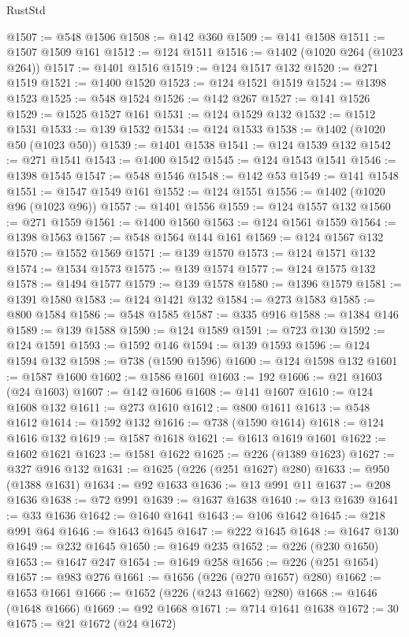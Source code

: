 \begin{lexlean}{RustStd}
\begin{coremodule}
{\begin{coremodule}
{{{{{{{{{{{{{{{{{{{{{{{{{{{{{{{{{{{{{@1507 := @548 @1506
@1508 := @142 @360
@1509 := @141 @1508
@1511 := @1507 @1509 @161
@1512 := @124 @1511
@1516 := @1402 (@1020 @264 (@1023 @264))
@1517 := @1401 @1516
@1519 := @124 @1517 @132
@1520 := @271 @1519
@1521 := @1400 @1520
@1523 := @124 @1521 @1519
@1524 := @1398 @1523
@1525 := @548 @1524
@1526 := @142 @267
@1527 := @141 @1526
@1529 := @1525 @1527 @161
@1531 := @124 @1529 @132
@1532 := @1512 @1531
@1533 := @139 @1532
@1534 := @124 @1533
@1538 := @1402 (@1020 @50 (@1023 @50))
@1539 := @1401 @1538
@1541 := @124 @1539 @132
@1542 := @271 @1541
@1543 := @1400 @1542
@1545 := @124 @1543 @1541
@1546 := @1398 @1545
@1547 := @548 @1546
@1548 := @142 @53
@1549 := @141 @1548
@1551 := @1547 @1549 @161
@1552 := @124 @1551
@1556 := @1402 (@1020 @96 (@1023 @96))
@1557 := @1401 @1556
@1559 := @124 @1557 @132
@1560 := @271 @1559
@1561 := @1400 @1560
@1563 := @124 @1561 @1559
@1564 := @1398 @1563
@1567 := @548 @1564 @144 @161
@1569 := @124 @1567 @132
@1570 := @1552 @1569
@1571 := @139 @1570
@1573 := @124 @1571 @132
@1574 := @1534 @1573
@1575 := @139 @1574
@1577 := @124 @1575 @132
@1578 := @1494 @1577
@1579 := @139 @1578
@1580 := @1396 @1579
@1581 := @1391 @1580
@1583 := @124 @1421 @132
@1584 := @273 @1583
@1585 := @800 @1584
@1586 := @548 @1585
@1587 := @335 @916
@1588 := @1384 @146
@1589 := @139 @1588
@1590 := @124 @1589
@1591 := @723 @130
@1592 := @124 @1591
@1593 := @1592 @146
@1594 := @139 @1593
@1596 := @124 @1594 @132
@1598 := @738 (@1590 @1596)
@1600 := @124 @1598 @132
@1601 := @1587 @1600
@1602 := @1586 @1601
@1603 := 192
@1606 := @21 @1603 (@24 @1603)
@1607 := @142 @1606
@1608 := @141 @1607
@1610 := @124 @1608 @132
@1611 := @273 @1610
@1612 := @800 @1611
@1613 := @548 @1612
@1614 := @1592 @132
@1616 := @738 (@1590 @1614)
@1618 := @124 @1616 @132
@1619 := @1587 @1618
@1621 := @1613 @1619 @1601
@1622 := @1602 @1621
@1623 := @1581 @1622
@1625 := @226 (@1389 @1623)
@1627 := @327 @916 @132
@1631 := @1625 (@226 (@251 @1627) @280)
@1633 := @950 (@1388 @1631)
@1634 := @92 @1633
@1636 := @13 @991 @11
@1637 := @208 @1636
@1638 := @72 @991
@1639 := @1637 @1638
@1640 := @13 @1639
@1641 := @33 @1636
@1642 := @1640 @1641
@1643 := @106 @1642
@1645 := @218 @991 @64
@1646 := @1643 @1645
@1647 := @222 @1645
@1648 := @1647 @130
@1649 := @232 @1645
@1650 := @1649 @235
@1652 := @226 (@230 @1650)
@1653 := @1647 @247
@1654 := @1649 @258
@1656 := @226 (@251 @1654)
@1657 := @983 @276
@1661 := @1656 (@226 (@270 @1657) @280)
@1662 := @1653 @1661
@1666 := @1652 (@226 (@243 @1662) @280)
@1668 := @1646 (@1648 @1666)
@1669 := @92 @1668
@1671 := @714 @1641 @1638
@1672 := 30
@1675 := @21 @1672 (@24 @1672)
}}}}}}}}}}}}}}}}}}}}}}}}}}}}}}}}}}}}}
\end{coremodule}}
\end{coremodule}
\end{lexlean}
